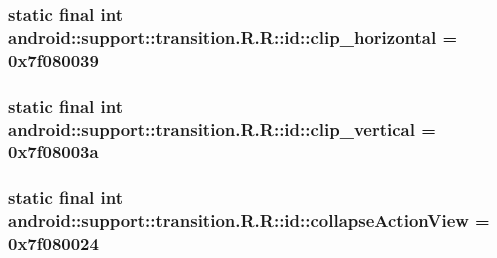 \hypertarget{classandroid_1_1support_1_1transition_1_1_r_1_1id_7b7aa199b7ac9832bc6ac7d90fab0cb3}{
\subsubsection[{clip\_\-horizontal}]{\setlength{\rightskip}{0pt plus 5cm}static final int android::support::transition.R.R::id::clip\_\-horizontal = 0x7f080039}}
\label{classandroid_1_1support_1_1transition_1_1_r_1_1id_7b7aa199b7ac9832bc6ac7d90fab0cb3}


\hypertarget{classandroid_1_1support_1_1transition_1_1_r_1_1id_29517378e9a3298248f47fb47e8a1351}{
\subsubsection[{clip\_\-vertical}]{\setlength{\rightskip}{0pt plus 5cm}static final int android::support::transition.R.R::id::clip\_\-vertical = 0x7f08003a}}
\label{classandroid_1_1support_1_1transition_1_1_r_1_1id_29517378e9a3298248f47fb47e8a1351}


\hypertarget{classandroid_1_1support_1_1transition_1_1_r_1_1id_13db29cd849b6f0f9d2728822a59d1aa}{
\subsubsection[{collapseActionView}]{\setlength{\rightskip}{0pt plus 5cm}static final int android::support::transition.R.R::id::collapseActionView = 0x7f080024}}
\label{classandroid_1_1support_1_1transition_1_1_r_1_1id_13db29cd849b6f0f9d2728822a59d1aa}


